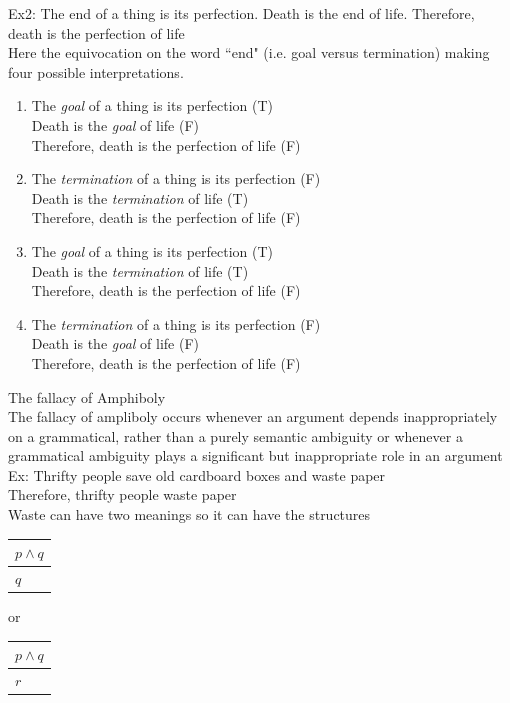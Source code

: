 \documentclass[11pt, fleqn]{article}
\begin{document}
Ex2: The end of a thing is its perfection. Death is the end of life. Therefore, death is the perfection of life\\
Here the equivocation on the word ``end" (i.e. goal versus termination) making four possible interpretations.
\begin{enumerate}
    \item The \textit{goal} of a thing is its perfection (T)\\
    Death is the \textit{goal} of life (F)\\
    Therefore, death is the perfection of life (F)
    \item The \textit{termination} of a thing is its perfection (F)\\
    Death is the \textit{termination} of life (T)\\
    Therefore, death is the perfection of life (F)
    \item The \textit{goal} of a thing is its perfection (T)\\
    Death is the \textit{termination} of life (T)\\
    Therefore, death is the perfection of life (F)
    \item The \textit{termination} of a thing is its perfection (F)\\
    Death is the \textit{goal} of life (F)\\
    Therefore, death is the perfection of life (F)
\end{enumerate}
The fallacy of Amphiboly\\
The fallacy of ampliboly occurs whenever an argument depends inappropriately on a grammatical, rather than a purely semantic ambiguity or whenever a grammatical ambiguity plays a significant but inappropriate role in an argument\\

Ex: Thrifty people save old cardboard boxes and waste paper\\
Therefore, thrifty people waste paper\\
Waste can have two meanings so it can have the structures\\
\begin{tabular}{p{1cm}}
    $p\wedge q$\\
    \hline
    $q$
\end{tabular} or \begin{tabular}{p{1cm}}
    $p\wedge q$\\
    \hline
    $r$
\end{tabular}
\end{document}

